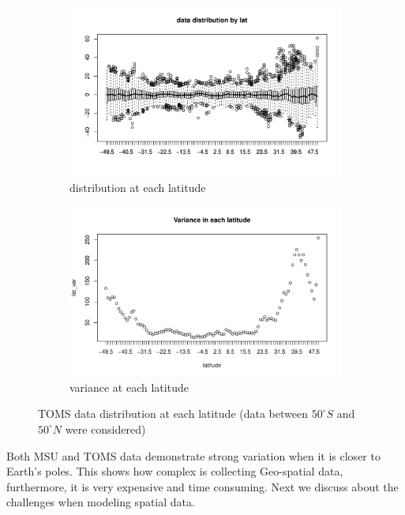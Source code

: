 \begin{figure}[H]
	\begin{subfigure}{.5\textwidth}
		\centering
		\includegraphics[width=1\linewidth]{graphs//TOMS_data_latitude}
		\caption{distribution at each latitude}
		\label{TOMS_data_latitude}
	\end{subfigure}
	\begin{subfigure}{.5\textwidth}
		\centering
		\includegraphics[width=1\linewidth]{graphs/TOMS_data_var_lat}
		\caption{variance at each latitude}
		\label{TOMS_data_var_lat}
	\end{subfigure}
	\caption[TOMS data distribution at each latitude (data between $50^\circ S$ and $50^\circ N$ were considered)]{TOMS data distribution at each latitude (data between $50^\circ S$ and $50^\circ N$ were considered)}
	\label{compare_varigram_sim_2}
\end{figure}


Both MSU and TOMS data demonstrate strong variation when it is closer to Earth's poles. This shows how complex is collecting Geo-spatial data, furthermore, it is very expensive and time consuming. Next we discuss about the challenges when modeling spatial data.  
\\

